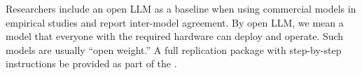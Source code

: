 Researchers \should include an open LLM as a baseline when using commercial models in empirical studies and report inter-model agreement. By open LLM, we mean a model that everyone with the required hardware can deploy and operate. Such models are usually ``open weight.'' A full replication package with step-by-step instructions \should be provided as part of the \supplementarymaterial.